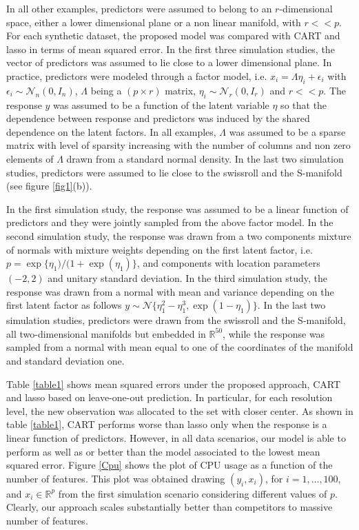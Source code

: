 \documentclass{article}
\newcommand{\Real}{\mathbb{R}}
\providecommand{\mc}[1]{\mathcal{#1}}
\begin{document}
In all other examples, predictors were assumed to belong to an $r$-dimensional space, either a lower dimensional plane or a non linear manifold, with $r<<p$. For each synthetic dataset, the proposed model was compared with CART and lasso in terms of mean squared error. In the first three simulation studies, the vector of predictors was assumed to lie close to a lower dimensional plane. In practice,  predictors were modeled through a factor model, i.e. $x_i=\Lambda \eta_i + \epsilon_i$ with $\epsilon_i \sim \mc{N}_n(0,I_n)$, $\Lambda$ being a $(p \times r)$ matrix, $\eta_i \sim \mc{N}_r(0,I_r)$ and $r<<p$. The response $y$ was assumed to be a function of the latent variable $\eta$ so that  the dependence between response and predictors was induced by the shared dependence on the latent factors.  In all examples, $\Lambda$ was assumed to be a sparse matrix with level of sparsity increasing with the number of columns and non zero elements of $\Lambda$ drawn from a standard normal density. In the last two simulation studies, predictors were assumed to lie close to the swissroll and the S-manifold (see figure \ref{fig1}(b)).
%


In the first simulation study, the response was assumed to be a linear function of predictors and they were jointly sampled from the above factor model.  In the second simulation study,  the response was drawn from a two components mixture of normals with mixture weights depending on the first latent factor, i.e. $p=\exp\{\eta_1)/(1+\exp(\eta_1)\}$, and components with location parameters $(-2,2)$ and unitary standard deviation.  In the third simulation study, the response was drawn from a normal with mean and variance depending on the first latent factor as follows $y \sim \mc{N}\{\eta_1^2-\eta_1^3, \exp(1-\eta_1)\}$. In the last two simulation studies, predictors were drawn from the swissroll and the S-manifold, all two-dimensional manifolds but embedded in $\Real^{50}$, while the response was sampled from a normal with mean equal to one of the coordinates of the manifold and standard deviation one.

Table \ref{table1} shows mean squared errors under the proposed approach, CART and lasso based on leave-one-out prediction. In particular, for each resolution level, the new observation was allocated to the set with closer center. As shown in table \ref{table1}, CART performs worse than lasso only when the response is a linear function of predictors. However, in all data scenarios, our model is able to perform as well as or better than the model associated to the lowest mean squared error.  Figure \ref{Cpu} shows the plot of CPU usage as a function of the number of features. This plot was obtained drawing $(y_i, x_i)$, for $i=1, \ldots, 100$, and $x_i \in \Real^p$  from the first simulation scenario considering different values of $p$. Clearly, our approach scales substantially better than competitors to massive number of features.
\end{document}
